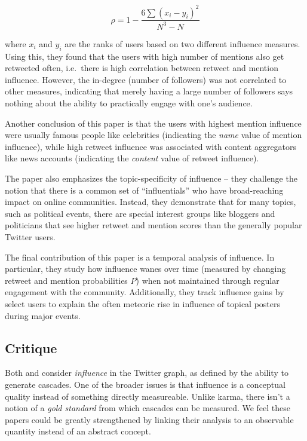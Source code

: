 \documentclass[10pt]{article}
\begin{document}
\begin{equation}
  \rho = 1 - \frac{6\sum{(x_i - y_i)^2}}{N^3 - N}
\end{equation}

where $x_i$ and $y_i$ are the ranks of users based on two different influence
measures. Using this, they found that the users with high number of mentions
also get retweeted often, i.e.\ there is high correlation between retweet and
mention influence. However, the in-degree (number of followers) was not
correlated to other measures, indicating that merely having a large number of
followers says nothing about the ability to practically engage with one's
audience.

Another conclusion of this paper is that the users with highest mention
influence were usually famous people like celebrities (indicating the
\emph{name} value of mention influence), while high retweet influence was
associated with content aggregators like news accounts (indicating the
\emph{content} value of retweet influence).

The paper also emphasizes the topic-specificity of influence -- they challenge
the notion that there is a common set of ``influentials'' who have
broad-reaching impact on online communities. Instead, they demonstrate that for
many topics, such as political events, there are special interest groups like
bloggers and politicians that see higher retweet and mention scores than the
generally popular Twitter users.

The final contribution of this paper is a temporal analysis of influence. In
particular, they study how influence wanes over time (measured by changing retweet
and mention probabilities $P$) when not maintained through regular engagement
with the community. Additionally, they track influence gains by select users
to explain the often meteoric rise in influence of topical posters during major
events.

\subsection{Critique} 
Both \citet{bakshy2011everyone} and
\citet{cha2010measuring} consider \textit{influence} in the Twitter graph, as
defined by the ability to generate cascades. One of the broader issues is that
influence is a conceptual quality instead of something directly measureable.
Unlike karma, there isn't a notion of a \textit{gold standard} from which
cascades can be measured.  We feel these papers could be greatly strengthened
by linking their analysis to an observable quantity instead of an abstract
concept.
\end{document}

